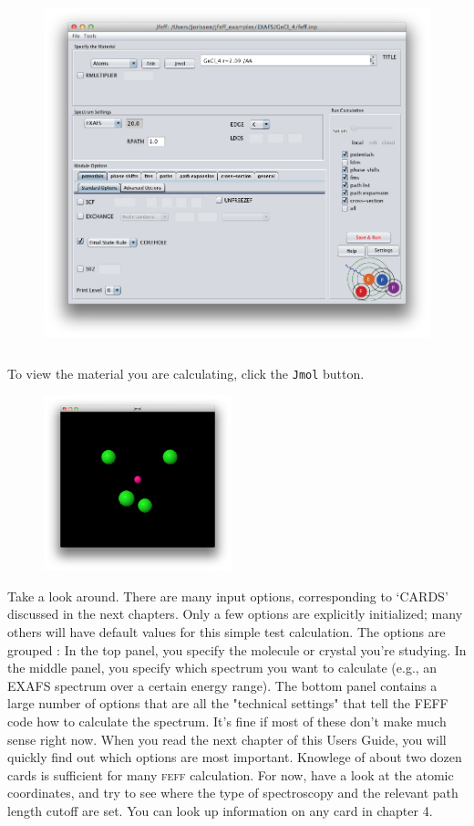\documentclass[11pt,oneside]{report} %
\newcommand{\program}[1]{\textsc{#1}}
\newcommand{\feff}{\program{feff}}
\begin{document}
\begin{figure}[H]
	\centering
		\includegraphics[height=4.0in]{open2.png}
	\label{fig:open2}
\end{figure}

To view the material you are calculating, click the \texttt{Jmol} button.
\begin{figure}[H]
	\centering
		\includegraphics[height=2.0in]{view1.png}
	\label{fig:view1}
\end{figure}


Take a look around.  There are many input options, corresponding to `CARDS' discussed in the next chapters.  Only a few options are explicitly initialized; many others will have default values for this simple test calculation.  The options are grouped :  In the top panel, you specify the molecule or crystal you're studying.  In the middle panel, you specify which spectrum you want to calculate (e.g., an EXAFS spectrum over a certain energy range).  The bottom panel contains a large number of options that are all the "technical settings" that tell the FEFF code how to calculate the spectrum.  It's fine if most of these don't make much sense right now.  When you read the next chapter of this Users Guide, you will quickly find out which options are most important.  Knowlege of about two dozen cards is sufficient for many {\feff} calculation.  For now, have a look at the atomic coordinates, and try to see where the type of spectroscopy and the relevant path length cutoff are set.  You can look up information on any card in chapter 4.  
\end{document}
